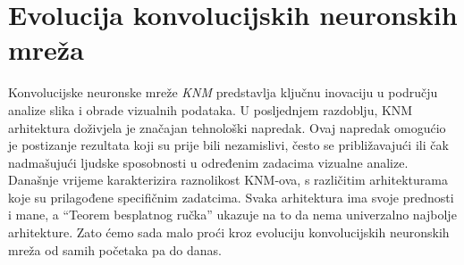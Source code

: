 
\chapter{Evolucija konvolucijskih neuronskih mreža}\label{ch:evolucija-konvolucijskih-neuronskih-mreza}
Konvolucijske neuronske mreže \emph{KNM} predstavlja ključnu inovaciju u području analize slika i obrade vizualnih podataka.
U posljednjem razdoblju, KNM arhitektura doživjela je značajan tehnološki napredak.
Ovaj napredak omogućio je postizanje rezultata koji su prije bili nezamislivi, često se približavajući ili čak nadmašujući ljudske sposobnosti u određenim zadacima vizualne analize.
Današnje vrijeme karakterizira raznolikost KNM-ova, s različitim arhitekturama koje su prilagođene specifičnim zadatcima.
Svaka arhitektura ima svoje prednosti i mane, a \enquote{Teorem besplatnog ručka} ukazuje na to da nema univerzalno najbolje arhitekture.
Zato ćemo sada malo proći kroz evoluciju konvolucijskih neuronskih mreža od samih početaka pa do danas.
